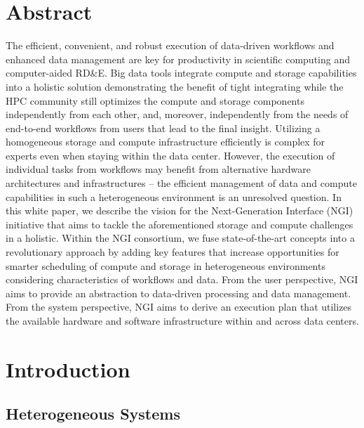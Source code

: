 \documentclass[a4paper, twocolumn]{article}
\title{\papertitle}
\author{Julian M. Kunkel \\
  \textit{University of Reading}
	\and
  A
  \and
  B
  \and
  C
}
\date{\today}
\begin{document}
\maketitle
\thispagestyle{fancy}

\section*{Abstract}

The efficient, convenient, and robust execution of data-driven workflows and enhanced data management are key for productivity in scientific computing and computer-aided RD\&E.
Big data tools integrate compute and storage capabilities into a holistic solution demonstrating the benefit of tight integrating while the HPC community still optimizes the compute and storage components independently from each other, and, moreover, independently from the needs of end-to-end workflows from users that lead to the final insight.
Utilizing a homogeneous storage and compute infrastructure efficiently is complex for experts even when staying within the data center.
However, the execution of individual tasks from workflows may benefit from alternative hardware architectures and infrastructures -- the efficient management of data and compute capabilities in such a heterogeneous environment is an unresolved question.
In this white paper, we describe the vision for the Next-Generation Interface (NGI) initiative that aims to tackle the aforementioned storage and compute challenges in a holistic.
Within the NGI consortium, we fuse state-of-the-art concepts into a revolutionary approach by adding key features that increase opportunities for smarter scheduling of compute and storage in heterogeneous environments considering characteristics of workflows and data.
From the user perspective, NGI aims to provide an abstraction to data-driven processing and data management.
From the system perspective, NGI aims to derive an execution plan that utilizes the available hardware and software infrastructure within and across data centers.

\section{Introduction}

\subsection{Heterogeneous Systems}
\end{document}
